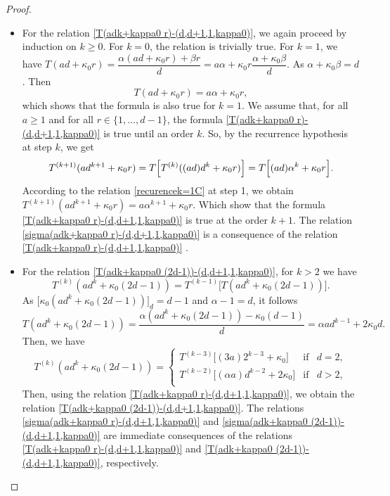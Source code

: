 \documentclass[10pt,a4paper]{amsart}
\begin{document}
\begin{proof}
	\begin{itemize}
		\item For the relation  \eqref{T(adk+kappa0 r)-(d,d+1,1,kappa0)}, we again proceed by induction on $k\geq 0$. For $k=0$, the relation is trivially true. For $k=1$, we have 
		$T(ad+\kappa_0 r)=\dfrac{\alpha(ad+\kappa_0 r )+\beta r}{d}=a \alpha +\kappa_0 r  \dfrac{\alpha +\kappa_0\beta }{d}$.
		As  $\alpha +\kappa_0 \beta= d$. Then
		\begin{equation}\label{recurencek=1C} 
			T(ad+\kappa_0  r)=a \alpha +\kappa_0r, 
		\end{equation}	
		which shows that the formula is also true for $k=1$. We assume that, for all $a\geq 1$  and for all $r\in\{1,\ldots,d-1\}$,
		the formula \eqref{T(adk+kappa0 r)-(d,d+1,1,kappa0)} is true until an order $k$.   So,  by  the recurrence hypothesis at step $k$, we get
		$$T^{(k+1)}(ad^{k+1}+\kappa_0 r)=T\Bigl[T^{(k)}((ad)d^{k}+\kappa_0 r )\Bigr]=T\Bigl[(ad)\alpha^{k}+\kappa_0r\Bigr].$$
		According to the relation \eqref{recurencek=1C} at step 1, we obtain
		$T^{(k+1)}(ad^{k+1}+\kappa_0 r)=a\alpha^{k+1}+\kappa_0r$.
		Which show that the formula  \eqref{T(adk+kappa0 r)-(d,d+1,1,kappa0)}  is true at the order $k+1$. The relation \eqref{sigma(adk+kappa0 r)-(d,d+1,1,kappa0)} is a consequence of the relation  \eqref{T(adk+kappa0 r)-(d,d+1,1,kappa0)} .
		
		\item For the relation  \eqref{T(adk+kappa0 (2d-1))-(d,d+1,1,kappa0)}, for $k> 2$ we have
		$$T^{(k)}(ad^k+\kappa_0 (2d-1))=T^{(k-1)}\bigl[T(ad^k+\kappa_0 (2d-1))\bigr].$$
		As  $\bigl[\kappa_0(ad^k+\kappa_0 (2d-1))\bigr]_d=d-1$ and $\alpha-1=d$, it follows 
		$$T(ad^k+\kappa_0 (2d-1))=\dfrac{\alpha(ad^k+\kappa_0 (2d-1))-\kappa_0(d-1)}{d}=\alpha ad^{k-1}+2\kappa_0d.$$
		Then,  we have
		\begin{equation}\label{R-3}
			T^{(k)}(ad^k+\kappa_0 (2d-1))=\left\{\begin{array}{lll}
				T^{(k-3)}\bigl[(3 a)2^{k-3}+\kappa_0\bigr] &\mathrm{if}& d=2,\\
				T^{(k-2)}\bigl[(\alpha a)d^{k-2}+2\kappa_0\bigr] &\mathrm{if}& d>2,\\
			\end{array}\right.
		\end{equation} 
		Then, using the relation    \eqref{T(adk+kappa0 r)-(d,d+1,1,kappa0)}, we obtain the relation \eqref{T(adk+kappa0 (2d-1))-(d,d+1,1,kappa0)}.
		The relations \eqref{sigma(adk+kappa0 r)-(d,d+1,1,kappa0)}
		and  \eqref{sigma(adk+kappa0 (2d-1))-(d,d+1,1,kappa0)}
		are  immediate consequences of the relations 
		\eqref{T(adk+kappa0 r)-(d,d+1,1,kappa0)} and
		\eqref{T(adk+kappa0 (2d-1))-(d,d+1,1,kappa0)}, respectively.
	\end{itemize}
	\hfill\end{proof}
\end{document}
